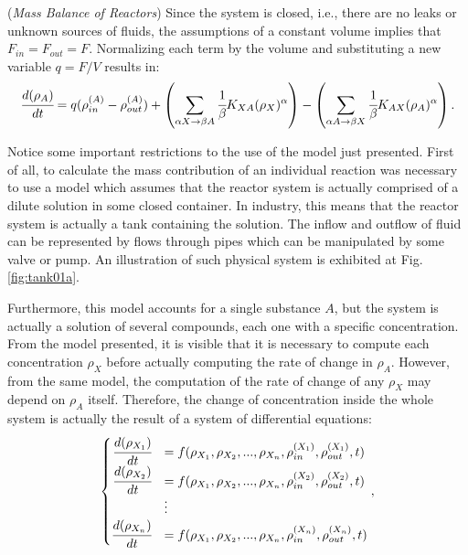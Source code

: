 \documentclass[a4paper,11pt]{book}
\numberwithin{figure}{chapter}
\numberwithin{equation}{chapter}
\numberwithin{table}{chapter}
\theoremstyle{definition}
\newtheorem{example}{Example}[chapter]
\newcounter{boxed-theorem}
\newcounter{boxed-lemma}
\newcounter{boxed-definition}
\newcounter{boxed-example}
\newenvironment{boxed-example}[1]
{\colorlet{shadecolor}{pastelRed!15} \begin{shaded} \begin{example}{#1}}
{\end{example} \end{shaded}}
\begin{document}
\begin{boxed-example}{(\textit{Mass Balance of Reactors})}
    Since the system is closed, i.e., there are no leaks or unknown sources of fluids, the assumptions of a constant volume implies that $F_{in} = F_{out} = F$. Normalizing each term by the volume and substituting a new variable $q = F/V$ results in:
    \begin{equation} \label{eq:isoModel3}
            \cfrac{d (\rho_A)}{dt} = q (\rho^{(A)}_{in} - \rho^{(A)}_{out}) + \left( \sum_{\alpha X \rightarrow \beta A} \cfrac{1}{\beta} K_{XA} (\rho_X)^{\alpha} \right) - \left(\sum_{\alpha A \rightarrow \beta X} \cfrac{1}{\beta} K_{AX} (\rho_A)^{\alpha} \right)
    .\end{equation}
\end{boxed-example}

Notice some important restrictions to the use of the model just presented. First of all, to calculate the mass contribution of an individual reaction was necessary to use a model which assumes that the reactor system is actually comprised of a dilute solution in some closed container. In industry, this means that the reactor system is actually a tank containing the solution. The inflow and outflow of fluid can be represented by flows through pipes which can be manipulated by some valve or pump. An illustration of such physical system is exhibited at Fig. \ref{fig:tank01a}.

Furthermore, this model accounts for a single substance $A$, but the system is actually a solution of several compounds, each one with a specific concentration. From the model presented, it is visible that it is necessary to compute each concentration $\rho_X$ before actually computing the rate of change in $\rho_A$. However, from the same model, the computation of the rate of change of any $\rho_X$ may depend on $\rho_A$ itself. Therefore, the change of concentration inside the whole system is actually the result of a system of differential equations:
\begin{align}   \label{eq:isoSys01}
\begin{cases}
    \hfill \cfrac{d (\rho_{X_1})}{dt} &= f(\rho_{X_1}, \rho_{X_2}, ..., \rho_{X_n}, \rho_{in}^{(X_1)}, \rho_{out}^{(X_1)}, t) \\
    \hfill \cfrac{d (\rho_{X_2})}{dt} &= f(\rho_{X_1}, \rho_{X_2}, ..., \rho_{X_n}, \rho_{in}^{(X_2)}, \rho_{out}^{(X_2)}, t) \\
    & \vdots   \\
    \hfill \cfrac{d (\rho_{X_n})}{dt} &= f(\rho_{X_1}, \rho_{X_2}, ..., \rho_{X_n}, \rho_{in}^{(X_n)}, \rho_{out}^{(X_n)}, t)
\end{cases}
,\end{align}
\end{document}
